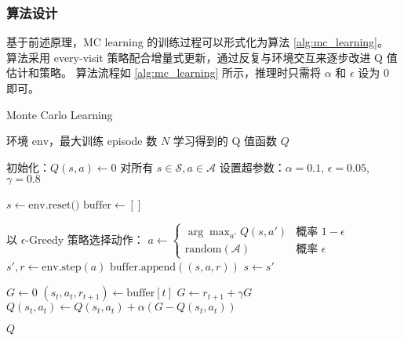 

\subsubsection{算法设计}

基于前述原理，MC learning 的训练过程可以形式化为算法 \ref{alg:mc_learning}。
算法采用 every-visit 策略配合增量式更新，通过反复与环境交互来逐步改进 Q 值估计和策略。
算法流程如 \ref{alg:mc_learning} 所示，推理时只需将 $\alpha$ 和 $\epsilon$ 设为 0 即可。

\begin{algorithm}[h]
    \caption{Monte Carlo Learning}
    \small
    \label{alg:mc_learning}
    \begin{algorithmic}[1]
        \Require 环境 $\text{env}$，最大训练 episode 数 $N$
        \Ensure 学习得到的 Q 值函数 $Q$
        
        \State 初始化：$Q(s,a) \leftarrow 0$ 对所有 $s \in \mathcal{S}, a \in \mathcal{A}$
        \State 设置超参数：$\alpha = 0.1$, $\epsilon = 0.05$, $\gamma = 0.8$
        
            \State $s \leftarrow \text{env.reset()}$ 
            \State $\text{buffer} \leftarrow []$ 
            
                \State 以 $\epsilon$-Greedy 策略选择动作：
                \State \quad $a \leftarrow \begin{cases} 
                    \arg\max_{a'} Q(s, a') & \text{概率 } 1-\epsilon \\
                    \text{random}(\mathcal{A}) & \text{概率 } \epsilon
                \end{cases}$
                \State $s', r \leftarrow \text{env.step}(a)$ 
                \State $\text{buffer.append}((s, a, r))$ 
                \State $s \leftarrow s'$
            \EndWhile
            
            \State $G \leftarrow 0$ 
                \State $(s_t, a_t, r_{t+1}) \leftarrow \text{buffer}[t]$
                \State $G \leftarrow r_{t+1} + \gamma G$ 
                \State $Q(s_t, a_t) \leftarrow Q(s_t, a_t) + \alpha (G - Q(s_t, a_t))$ 
            \EndFor
        \EndFor
        
        \Return $Q$
    \end{algorithmic}
\end{algorithm}


